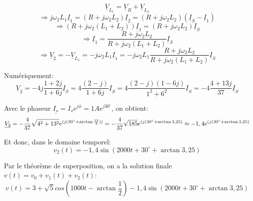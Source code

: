{$$\underline{V}_{L_1} = \underline{V}_{R}+\underline{V}_{L_2}$$
$$\Rightarrow j \omega_2 L_1 \underline{I}_1=(R+j\omega_2 L_2) \underline{I}_2=(R+j\omega_2 L_2) (\underline{I}_S-\underline{I}_1)$$
$$\Rightarrow (R+j \omega_2 (L_1+L_2)) \underline{I}_1=(R+j\omega_2 L_2) \underline{I}_S$$
$$\Rightarrow \underline{I}_1=\frac{R+j\omega_2 L_2}{R+j \omega_2 (L_1+L_2)} \underline{I}_S$$
$$\Rightarrow \underline{V}_2=-\underline{V}_{L_1}=-j \omega_2 L_1 \underline{I}_1=-j \omega_2 L_1\frac{R+j\omega_2 L_2}{R+j \omega_2 (L_1+L_2)} \underline{I}_S$$

Numériquement:\\
$$\underline{V}_2=-4j \frac{1+2j}{1+6j}\underline{I}_S=4\frac{(2-j)}{1+6j}\underline{I}_S=4\frac{(2-j)(1-6j)}{1^2+6^2}\underline{I}_S=-4\frac{4+13j}{37}\underline{I}_S$$

Avec le phaseur $\underline{I_s}=I_s e^{j\phi}=1A e^{j30^{\circ}}$, on obtient:
$$\underline{V_2}=-\frac{4}{37}\sqrt{4^2+13^2}e^{(j(30^{\circ}+\arctan{\frac{13}{4}))}}=-\frac{4}{37}\sqrt{185}e^{(j(30^{\circ}+\arctan{3,25})} \\ \approx -1,4 e^{(j(30^{\circ}+\arctan{3,25})}$$

Et donc, dans le domaine temporel:
$$v_2(t)=-1,4 \sin(2000t+30^{\circ}+\arctan{3,25})$$

Par le théorème de superposition, on a la solution finale $v(t)=v_0+v_1(t)+v_2(t)$:
$$ v(t)=3+\sqrt{5}cos(1000t-\arctan{\frac{1}{2}})-1,4 \sin(2000t+30^{\circ}+\arctan{3,25}) $$
}


